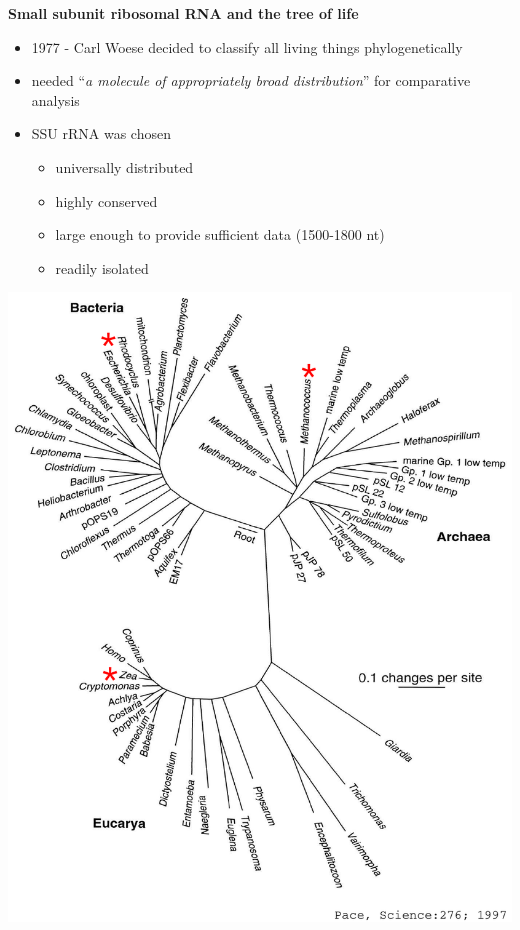 \documentclass[landscape]{slides}
\begin{document}
\begin{slide}
\begin{center}
\textbf{Small subunit ribosomal RNA and the tree of life}
\end{center}
\medskip
\begin{minipage}{5.2in}
\small

\begin{itemize}
\item 1977 - Carl Woese decided to classify all living things phylogenetically
\item needed ``\emph{a molecule of appropriately broad distribution}'' for comparative analysis
\item SSU rRNA was chosen
\begin{itemize}
  \item universally distributed
  \item highly conserved 
  \item large enough to provide sufficient data (1500-1800 nt)
  \item readily isolated
\end{itemize}
\end{itemize}

\vspace{2.7in}
\end{minipage}
\hspace{0.1in}
\begin{minipage}{5.5in}
\includegraphics[width=5.5in]{figs/bigtol}
\end{minipage}  
\end{slide}
\end{document}

